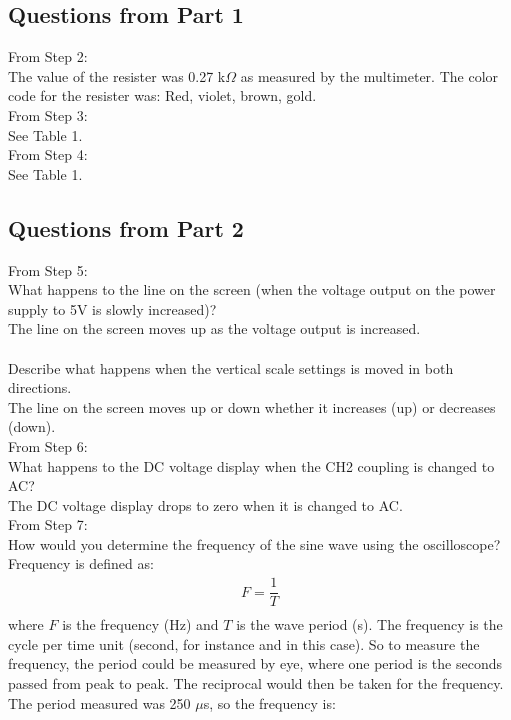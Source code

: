 \documentclass [12pt, letterpaper, twoside] {article}
\begin{document}
\subsection* {Questions from Part 1}
From Step 2: \\
The value of the resister was 0.27 k\(\Omega\) as measured by the multimeter. The color code for the resister was: Red, violet, brown, gold. \\

\noindent
From Step 3: \\
See Table 1. \\

\noindent
From Step 4: \\
See Table 1.

\subsection* {Questions from Part 2}
From Step 5: \\
What happens to the line on the screen (when the voltage output on the power supply to 5V is slowly increased)? \\
The line on the screen moves up as the voltage output is increased. \\\\
Describe what happens when the vertical scale settings is moved in both directions. \\
The line on the screen moves up or down whether it increases (up) or decreases (down). \\

\noindent
From Step 6: \\
What happens to the DC voltage display when the CH2 coupling is changed to AC? \\
The DC voltage display drops to zero when it is changed to AC. \\

\noindent
From Step 7: \\
How would you determine the frequency of the sine wave using the oscilloscope?
Frequency is defined as:
\begin{equation}
  \begin{split}
    F = \dfrac{1}{T} \\
  \end{split}
\end{equation}
where \(F\) is the frequency (Hz) and \(T\) is the wave period (s). The frequency is the cycle per time unit (second, for instance and in this case). So to measure the frequency, the period could be measured by eye, where one period is the seconds passed from peak to peak. The reciprocal would then be taken for the frequency. The period measured was 250 \(\mu\)s, so the frequency is:
\end{document}
